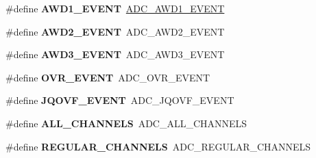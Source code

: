 \begin{DoxyCompactItemize}
\item 
\mbox{\label{group___h_a_l___a_d_c___aliased___defines_ga1429af679941d537c64f7004430fdf54}} 
\#define {\bfseries A\+W\+D1\+\_\+\+E\+V\+E\+NT}~\hyperlink{group___a_d_c___event__type_ga0e6a24521d8bdc762fd916fb48c45475}{A\+D\+C\+\_\+\+A\+W\+D1\+\_\+\+E\+V\+E\+NT}
\item 
\mbox{\label{group___h_a_l___a_d_c___aliased___defines_ga04d97e3fb4776a8fae622cf88b442687}} 
\#define {\bfseries A\+W\+D2\+\_\+\+E\+V\+E\+NT}~A\+D\+C\+\_\+\+A\+W\+D2\+\_\+\+E\+V\+E\+NT
\item 
\mbox{\label{group___h_a_l___a_d_c___aliased___defines_gabb3f690eef894c37c3f2c49e1d8c6c06}} 
\#define {\bfseries A\+W\+D3\+\_\+\+E\+V\+E\+NT}~A\+D\+C\+\_\+\+A\+W\+D3\+\_\+\+E\+V\+E\+NT
\item 
\mbox{\label{group___h_a_l___a_d_c___aliased___defines_gaf63a166dce844ba44197109fe3a3d02f}} 
\#define {\bfseries O\+V\+R\+\_\+\+E\+V\+E\+NT}~A\+D\+C\+\_\+\+O\+V\+R\+\_\+\+E\+V\+E\+NT
\item 
\mbox{\label{group___h_a_l___a_d_c___aliased___defines_gae63ff704e73ca97890da8a07e141bb96}} 
\#define {\bfseries J\+Q\+O\+V\+F\+\_\+\+E\+V\+E\+NT}~A\+D\+C\+\_\+\+J\+Q\+O\+V\+F\+\_\+\+E\+V\+E\+NT
\item 
\mbox{\label{group___h_a_l___a_d_c___aliased___defines_gac9dcdba2096f6b3adab742b8b1a256c2}} 
\#define {\bfseries A\+L\+L\+\_\+\+C\+H\+A\+N\+N\+E\+LS}~A\+D\+C\+\_\+\+A\+L\+L\+\_\+\+C\+H\+A\+N\+N\+E\+LS
\item 
\mbox{\label{group___h_a_l___a_d_c___aliased___defines_ga9480bc25f45fc189111dba13103c404e}} 
\#define {\bfseries R\+E\+G\+U\+L\+A\+R\+\_\+\+C\+H\+A\+N\+N\+E\+LS}~A\+D\+C\+\_\+\+R\+E\+G\+U\+L\+A\+R\+\_\+\+C\+H\+A\+N\+N\+E\+LS
\item 
\mbox{\label{group___h_a_l___a_d_c___aliased___defines_ga458eefd477e1e06e313716de162b7d0f}} 

\end{DoxyCompactItemize}
